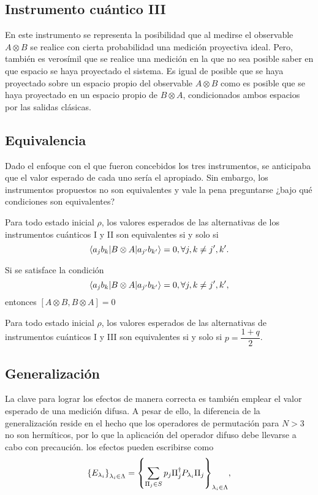 \documentclass[12pt,letterpaper]{book}\raggedbottom{}
\begin{document}
\subsection{Instrumento cuántico III}
 En este instrumento se representa la posibilidad que al medirse el observable $A\otimes B$ se realice con cierta probabilidad una medición proyectiva ideal. Pero, también es verosímil que se realice una medición en la que no sea posible saber en que espacio se haya proyectado el sistema. Es igual de posible que se haya proyectado sobre un espacio propio del observable $A\otimes B$ como es posible que se haya proyectado en un espacio propio de $B\otimes A$,  condicionados ambos espacios por las salidas clásicas. 


\subsection{Equivalencia}

Dado el enfoque con el que fueron concebidos los tres instrumentos, se anticipaba que el valor esperado de cada uno sería el apropiado. Sin embargo, los instrumentos propuestos no son equivalentes y vale la pena preguntarse ¿bajo qué condiciones son equivalentes?
\begin{proposition}\label{prop:Equivalencia-instruments1-2}
    Para todo estado inicial $\rho$, los valores esperados de las alternativas
de los instrumentos cuánticos I y II son equivalentes si y solo si \begin{equation}\label{eq:Condicion-equivalencia1-2}
    \langle a_j
b_k|B\otimes A|a_{j'}b_{k'}\rangle=0, \forall j,k\ne j',k'.
\end{equation}
\end{proposition}

\begin{proposition}
    Si se satisface la condición  \[\langle a_j b_k|B\otimes A|a_{j'}b_{k'}\rangle=0, \forall j,k\ne j',k', \]  entonces $[A\otimes B,B \otimes A]=0$  
\end{proposition}


\begin{proposition}\label{prop:Equivalencia-instruments-1-3}
    Para todo estado inicial $\rho$, los valores esperados de las alternativas
de instrumentos cuánticos I y III son equivalentes si y solo si
$p=\dfrac{1+q}{2}$.
\end{proposition}


\subsection{Generalización}
La clave para lograr los efectos de manera correcta es también emplear el valor
esperado de una medición difusa. A pesar de ello, la diferencia de la
generalización reside en el hecho que los operadores de permutación para $N>3$
no son hermíticos, por lo que la aplicación del operador difuso debe llevarse a
cabo con precaución.
los efectos pueden escribirse como
\begin{equation*}
    {\{E_{\lambda_i}\}}_{\lambda_i \in \Lambda}={\left\{\sum_{\Pi_j \in S} p_j \Pi_{j}^{\dagger}P_{\lambda_i}\Pi_{j}\right\}}_{\lambda_i \in \Lambda},
\end{equation*}  
\end{document}
